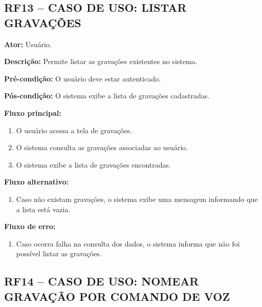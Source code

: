 \documentclass[12pt,oneside,a4paper,brazil,final]{abntex2}
\begin{document}
\clearpage
\subsection*{RF13 -- CASO DE USO: LISTAR GRAVAÇÕES}



\textbf{Ator:} Usuário.



\textbf{Descrição:} Permite listar as gravações existentes no sistema.



\textbf{Pré-condição:} O usuário deve estar autenticado.



\textbf{Pós-condição:} O sistema exibe a lista de gravações cadastradas.



\textbf{Fluxo principal:}

\begin{enumerate}

    \item O usuário acessa a tela de gravações.

    \item O sistema consulta as gravações associadas ao usuário.

    \item O sistema exibe a lista de gravações encontradas.

\end{enumerate}



\textbf{Fluxo alternativo:}

\begin{enumerate}

    \item Caso não existam gravações, o sistema exibe uma mensagem informando que a lista está vazia.

\end{enumerate}



\textbf{Fluxo de erro:}

\begin{enumerate}

    \item Caso ocorra falha na consulta dos dados, o sistema informa que não foi possível listar as gravações.

\end{enumerate}



\clearpage
\subsection*{RF14 -- CASO DE USO: NOMEAR GRAVAÇÃO POR COMANDO DE VOZ}
\end{document}
